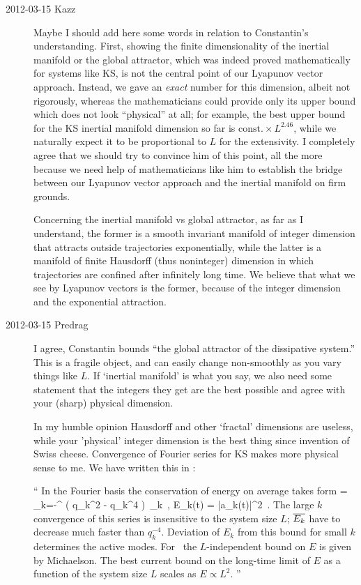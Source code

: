 \begin{description}
\item[2012-03-15 Kazz]
Maybe I should add here some words in relation to Constantin's understanding.
First, showing the finite dimensionality of the inertial manifold
 or the global attractor, which was indeed proved mathematically
 for systems like KS,
 is not the central point of our Lyapunov vector approach.
Instead, we gave an \textit{exact} number for this dimension,
 albeit not rigorously, whereas the mathematicians could provide
 only its upper bound which does not look ``physical'' at all;
 for example, the best upper bound for the KS inertial manifold dimension
 so far is $\text{const.} \times L^{2.46}$, while we naturally expect it
 to be proportional to $L$ for the extensivity.
I completely agree that we should try to convince him of this point,
 all the more because we need help of mathematicians like him to establish
 the bridge between our Lyapunov vector approach and the inertial manifold
 on firm grounds.

Concerning the inertial manifold vs global attractor, as far as I
understand, the former is a smooth invariant manifold of integer
dimension that attracts outside trajectories exponentially, while the
latter is a manifold of finite Hausdorff (thus noninteger) dimension in
which trajectories are confined after infinitely long time.
We believe that what we see by Lyapunov vectors is the former,
 because of the integer dimension and the exponential attraction.

\item[2012-03-15 Predrag] I agree, Constantin bounds ``the global
attractor of the dissipative system.'' This is a fragile object, and
can easily change non-smoothly as you vary things like $L$. If
`inertial manifold' is what you say, we also need some statement that
the integers they get are the best possible and agree with your (sharp)
physical dimension.

In my humble opinion Hausdorff and other `fractal' dimensions are
useless, while your 'physical' integer dimension is the best thing since
invention of Swiss cheese. Convergence of Fourier series for KS makes
more physical sense to me. We have written this in :

``
In the Fourier basis the conservation of energy on average takes form
 = \sum_{k=-\infty}^{\infty} ( q_k^2 - q_k^4 )\,
    _k
\,,\qquad
E_k(t) =  {\textstyle{}} |a_k(t)|^2
\,.
The large $k$ convergence of this series is insensitive to the system
size $L$; $\overline{E_k}$ have to decrease much faster than $q_k^{-4}$.
Deviation of $E_k$ from this bound for small $k$ determines the active
modes. For \eqva\ the $L$-independent bound on $E$ is given by
Michaelson. The best current bound
on the long-time limit of $E$ as a function of the system size $L$ scales
as $E \propto L^{2}$.
''


\end{description}
